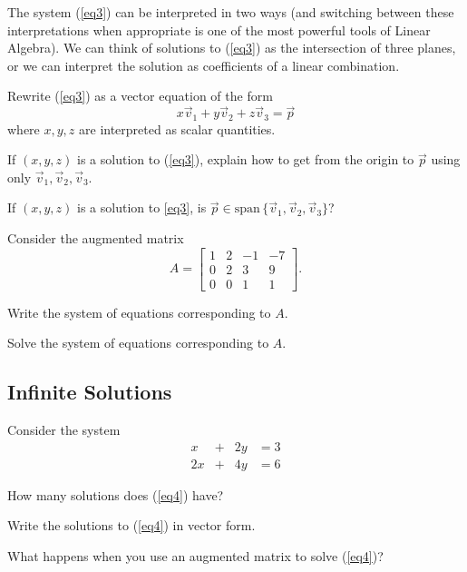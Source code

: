 \documentclass{problemset}
\newcommand{\Span}{\mathrm{span}\,}
\begin{document}
	The system (\ref{eq3}) can be interpreted in two ways (and switching between these 
	interpretations when appropriate is one of the most powerful tools of Linear 
	Algebra).  We can think of solutions to (\ref{eq3})
	as the intersection of three planes, or we can interpret the solution
	as coefficients of a linear combination.

	\begin{parts}[resume]
		\item Rewrite (\ref{eq3}) as a vector equation of the form
		\[
			x\vec v_1+y\vec v_2+z\vec v_3 = \vec p
		\]
		where $x,y,z$ are interpreted as scalar quantities.

		\item If $(x,y,z)$ is a solution to (\ref{eq3}), explain how to get from the
		origin to $\vec p$ using only $\vec v_1, \vec v_2, \vec v_3$.
		\item If $(x,y,z)$ is a solution to \eqref{eq3}, is $\vec p\in\Span\{\vec v_1,\vec v_2,\vec v_3\}$?
	\end{parts}

	\question
	Consider the augmented matrix
	\[
		A=\left[\begin{array}{ccc|c}
			1 & 2 & -1 & -7\\
			0 & 2 & 3 & 9\\
			0 & 0 & 1 & 1
		\end{array}\right].
	\]
	\begin{parts}
		\item Write the system of equations corresponding to $A$.
		\item Solve the system of equations corresponding to $A$.
	\end{parts}

\subsection*{Infinite Solutions}
	\question
	Consider the system
	\begin{equation}\label{eq4}
		\begin{array}{rcrl}
			x&+&2y &= 3\\
			2x&+&4y &= 6
		\end{array}
	\end{equation}

	\begin{parts}
		\item How many solutions does (\ref{eq4}) have?
		\item Write the solutions to (\ref{eq4}) in vector form.
		\item What happens when you use an augmented matrix
		to solve (\ref{eq4})?
	\end{parts}
\end{document}
